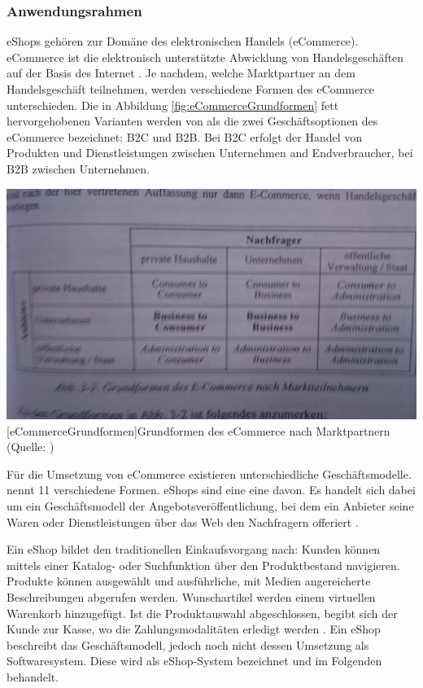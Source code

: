 \documentclass[12pt,a4paper,bibliography=totocnumbered,listof=totoc]{scrartcl}
\begin{document}
\subsubsection{Anwendungsrahmen}
eShops gehören zur Domäne des elektronischen Handels (eCommerce). eCommerce ist \glqq die elektronisch unterstützte Abwicklung von Handelsgeschäften auf der Basis des Internet\grqq{} \citep{schwarze02}. Je nachdem, welche Marktpartner an dem Handelsgeschäft teilnehmen, werden verschiedene Formen des eCommerce unterschieden. Die in Abbildung \ref{fig:eCommerceGrundformen} fett hervorgehobenen Varianten werden von \citet{meier12} als \glqq die zwei Geschäftsoptionen des eCommerce\grqq{} bezeichnet: \ac{B2C} und \ac{B2B}. Bei \ac{B2C} erfolgt der Handel von Produkten und Dienstleistungen zwischen Unternehmen and Endverbraucher, bei \ac{B2B} zwischen Unternehmen.

\vspace{1em}
\begin{minipage}{\linewidth}
	\centering
	\includegraphics[width=0.7\linewidth]{Abbildungen/eCommerceGrundformen.jpg}
	[eCommerceGrundformen]{Grundformen des eCommerce nach Marktpartnern (Quelle: \citet{schwarze02})}
	\label{fig:eCommerceGrundformen}
\end{minipage}
\vspace{1em}

Für die Umsetzung von eCommerce existieren unterschiedliche Geschäftsmodelle. \citet{timmers98} nennt 11 verschiedene Formen. eShops sind eine eine davon. Es handelt sich dabei um ein \glqq Geschäftsmodell der Angebotsveröffentlichung, bei dem ein Anbieter seine Waren oder Dienstleistungen über das Web den Nachfragern offeriert\grqq{} \citep{bartelt00}.

Ein eShop bildet den traditionellen Einkaufsvorgang nach: Kunden können mittels einer Katalog- oder Suchfunktion über den Produktbestand navigieren. Produkte können ausgewählt und ausführliche, mit Medien angereicherte Beschreibungen abgerufen werden. Wunschartikel werden einem virtuellen Warenkorb hinzugefügt. Ist die Produktauswahl abgeschlossen, begibt sich der Kunde zur \glqq Kasse\grqq{}, wo die Zahlungsmodalitäten erledigt werden \citep{boles00}. Ein eShop beschreibt das Geschäftsmodell, jedoch noch nicht dessen Umsetzung als Softwaresystem. Diese wird als eShop-System bezeichnet \citep{boles00} und im Folgenden behandelt.
\end{document}

